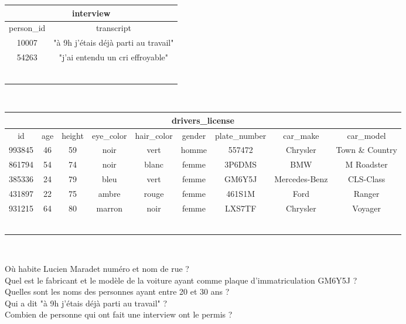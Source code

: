 \begin{Exercise}
\begin{center}
\begin{tabular}{|c c|}
\hline
\multicolumn{2}{|c|}{\textbf{interview}} \\
\hline
    person\_id & transcript \\
    \hline
    \hline
    10007	& "à 9h j'étais déjà parti au travail" \\
    54263 & "j'ai entendu un cri effroyable"  \\
    &  \\
    &  \\
    &  \\
    &  \\
    &  \\
    &  \\
\hline
\end{tabular}\\
\vspace{25pt}

\begin{tabular}{|c c c c c c c c c|}
\hline
\multicolumn{9}{|c|}{\textbf{drivers\_license}} \\
\hline
    id & age & height & eye\_color & hair\_color & gender & plate\_number & car\_make & car\_model \\
    \hline
    \hline
    993845	&46	&59	&noir	&vert	&homme	&557472	&Chrysler	&Town \& Country\\
    861794	&54	&74	&noir	&blanc	&femme	&3P6DMS	&BMW	&M Roadster\\
385336	&24	&79	&bleu	&vert	&femme	&GM6Y5J	&Mercedes-Benz	&CLS-Class   \\
431897	&22	&75	&ambre	&rouge	&femme	&461S1M	&Ford	&Ranger\\
931215	&64	&80	&marron	&noir	&femme	&LXS7TF	&Chrysler	&Voyager\\
& & & & & & & &  \\
& & & & & & & &  \\
& & & & & & & &  \\
& & & & & & & &  \\
& & & & & & & &  \\
& & & & & & & &  \\
\hline

\hline
\end{tabular}\\    
\end{center}


    \Question Où habite Lucien Maradet numéro et nom de rue ?\\
    \emptybox{1cm}
    \Question Quel est le fabricant et le modèle de la voiture ayant comme plaque d'immatriculation GM6Y5J ?\\
    \emptybox{1cm}
    \Question Quelles sont les noms des personnes ayant entre 20 et 30 ans ?\\
    \emptybox{1cm}
    \Question Qui a dit "à 9h j'étais déjà parti au travail" ?\\
    \emptybox{1cm}
    \Question Combien de personne qui ont fait une interview ont le permis ?\\
    \emptybox{1cm}



\end{Exercise}
